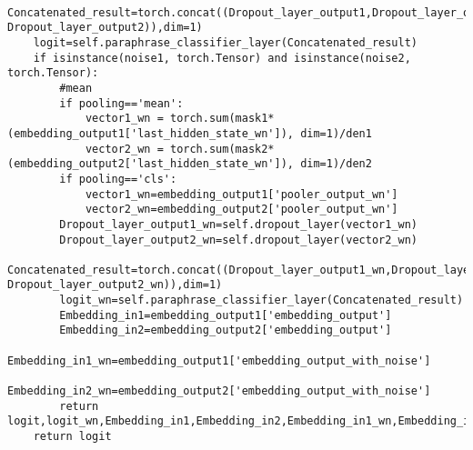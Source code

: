\begin{lstlisting}
    Concatenated_result=torch.concat((Dropout_layer_output1,Dropout_layer_output2,abs(Dropout_layer_output1-Dropout_layer_output2)),dim=1)
    logit=self.paraphrase_classifier_layer(Concatenated_result)
    if isinstance(noise1, torch.Tensor) and isinstance(noise2, torch.Tensor):
        #mean
        if pooling=='mean':
            vector1_wn = torch.sum(mask1*(embedding_output1['last_hidden_state_wn']), dim=1)/den1
            vector2_wn = torch.sum(mask2*(embedding_output2['last_hidden_state_wn']), dim=1)/den2
        if pooling=='cls':
            vector1_wn=embedding_output1['pooler_output_wn']
            vector2_wn=embedding_output2['pooler_output_wn']        
        Dropout_layer_output1_wn=self.dropout_layer(vector1_wn)
        Dropout_layer_output2_wn=self.dropout_layer(vector2_wn)
        Concatenated_result=torch.concat((Dropout_layer_output1_wn,Dropout_layer_output2_wn,abs(Dropout_layer_output1_wn-Dropout_layer_output2_wn)),dim=1)
        logit_wn=self.paraphrase_classifier_layer(Concatenated_result)
        Embedding_in1=embedding_output1['embedding_output']
        Embedding_in2=embedding_output2['embedding_output']
        Embedding_in1_wn=embedding_output1['embedding_output_with_noise']
        Embedding_in2_wn=embedding_output2['embedding_output_with_noise']
        return logit,logit_wn,Embedding_in1,Embedding_in2,Embedding_in1_wn,Embedding_in2_wn
    return logit
\end{lstlisting}

